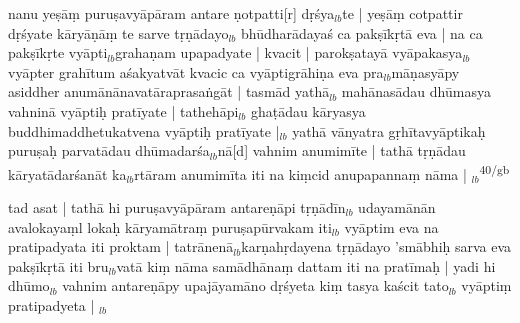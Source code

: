 \documentclass[article,12pt,a4paper]{memoir}%
\newcounter{parCount}
\begin{document}
	  
	  \pstart \leavevmode%
	nanu yeṣāṃ puruṣavyāpāram antare \leavevmode{}ṇotpatti[r] dṛśya{\tiny $_{lb}$}te | yeṣāṃ cotpattir dṛśyate kāryāṇāṃ te sarve tṛṇādayo{\tiny $_{lb}$} bhūdharādayaś ca pakṣīkṛtā eva | na ca pakṣīkṛte vyāpti{\tiny $_{lb}$}grahaṇam upapadyate | kvacit | parokṣatayā vyāpakasya{\tiny $_{lb}$} vyāpter grahītum aśakyatvāt kvacic ca vyāptigrāhiṇa eva pra{\tiny $_{lb}$}māṇasyāpy asiddher anumānānavatāraprasaṅgāt | tasmād yathā{\tiny $_{lb}$} mahānasādau dhūmasya vahninā vyāptiḥ pratīyate | tathehāpi{\tiny $_{lb}$} ghaṭādau kāryasya buddhimaddhetukatvena vyāptiḥ pratīyate |{\tiny $_{lb}$} yathā vānyatra gṛhītavyāptikaḥ puruṣaḥ parvatādau dhūmadarśa{\tiny $_{lb}$}nā[d] vahnim anumimīte | tathā tṛṇādau kāryatādarśanāt ka{\tiny $_{lb}$}rtāram anumimīta iti na kiṃcid anupapannaṃ nāma |
	{}
	\pend%
      {\tiny $_{lb}$}\textsuperscript{\textenglish{40/gb}}

	  
	  \pstart \leavevmode%
	tad asat | tathā hi puruṣavyāpāram antareṇāpi tṛṇādīn{\tiny $_{lb}$} udayamānān avalokayaṃl lokaḥ kāryamātraṃ puruṣapūrvakam iti{\tiny $_{lb}$} vyāptim eva na \leavevmode{} pratipadyata iti proktam | tatrānenā{\tiny $_{lb}$}karṇahṛdayena tṛṇādayo 'smābhiḥ sarva eva pakṣīkṛtā iti bru{\tiny $_{lb}$}vatā kiṃ nāma samādhānaṃ dattam iti na pratīmaḥ | yadi hi dhūmo{\tiny $_{lb}$} vahnim antareṇāpy upajāyamāno dṛśyeta kiṃ tasya kaścit tato{\tiny $_{lb}$} vyāptiṃ pratipadyeta |
	{}
	\pend%
      {\tiny $_{lb}$}
\end{document}
